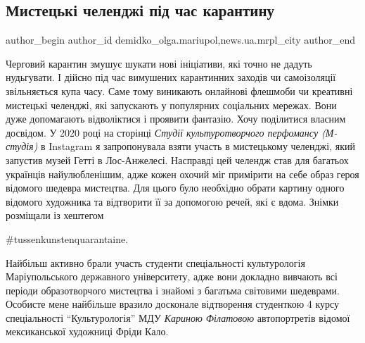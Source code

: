  
 
 
 
 
 
\subsection{Мистецькі челенджі під час карантину}
\label{sec:29_10_2021.stz.news.ua.mrpl_city.1.mystecki_chellendzi_karantin}
 
\ifcmt
 author_begin
   author_id demidko_olga.mariupol,news.ua.mrpl_city
 author_end
\fi


Черговий карантин змушує шукати нові ініціативи, які точно не дадуть
нудьгувати. І дійсно під час вимушених карантинних заходів чи самоізоляції
звільняється купа часу. Саме тому виникають онлайнові флешмоби чи креативні
мистецькі челенджі, які запускають у популярних соціальних мережах. Вони дуже
допомагають відволіктися і проявити фантазію. Хочу поділитися власним досвідом.
У 2020 році на сторінці \emph{Студії культуротворчого перфомансу (М-студія)} в
Instagram я запропонувала взяти участь в мистецькому челенджі, який запустив
музей Гетті в Лос-Анжелесі. Насправді цей челендж став для багатьох українців
найулюбленішим, адже кожен охочий міг примірити на себе образ героя відомого
шедевра мистецтва. Для цього було необхідно обрати картину одного відомого
художника та відтворити її за допомогою речей, які є вдома. Знімки розміщали із
хештегом\par\noindent\#tussenkunstenquarantaine.


Найбільш активно брали участь студенти спеціальності культурологія
Маріупольського державного університету, адже вони докладно вивчають всі
періоди образотворчого мистецтва і знайомі з багатьма світовими шедеврами.
Особисте мене найбільше вразило досконале відтворення студенткою 4 курсу
спеціальності \enquote{Культурологія} МДУ \emph{Кариною Філатовою} автопортретів відомої
мексиканської художниці Фріди Кало.

